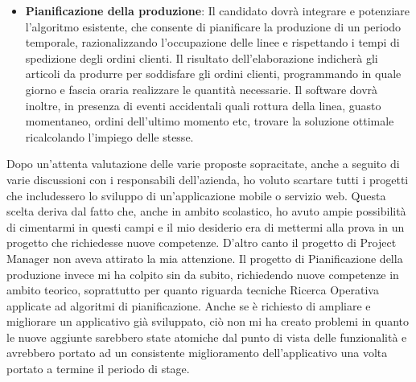 \begin{itemize}
	\item \textbf{Pianificazione della produzione}: Il candidato dovrà integrare e potenziare l’algoritmo esistente, che consente di
	pianificare la produzione di un periodo temporale, razionalizzando l’occupazione delle
	linee e rispettando i tempi di spedizione degli ordini clienti.
	Il risultato dell’elaborazione indicherà gli articoli da produrre per soddisfare gli ordini
	clienti, programmando in quale giorno e fascia oraria realizzare le quantità necessarie. Il
	software dovrà inoltre, in presenza di eventi accidentali quali rottura della linea, guasto
	momentaneo, ordini dell’ultimo momento etc, trovare la soluzione ottimale
	ricalcolando l’impiego delle stesse.
	
	
\end{itemize}


Dopo un'attenta valutazione delle varie proposte sopracitate, anche a seguito di varie discussioni con i responsabili dell'azienda, ho voluto scartare tutti i progetti
che includessero lo sviluppo di un'applicazione mobile o servizio web. Questa scelta deriva dal fatto che, anche in ambito scolastico, ho avuto ampie possibilità di 
cimentarmi in questi campi e il mio desiderio era di mettermi alla prova in un progetto che richiedesse nuove competenze. D'altro canto il progetto di Project Manager
non aveva attirato la mia attenzione. Il progetto di Pianificazione della produzione invece mi ha colpito sin da subito, richiedendo nuove competenze in ambito teorico,
soprattutto per quanto riguarda tecniche Ricerca Operativa applicate ad algoritmi di pianificazione. Anche se è richiesto di ampliare e migliorare un applicativo già 
sviluppato, ciò non mi ha creato problemi in quanto le nuove aggiunte sarebbero state atomiche dal punto di vista delle funzionalità e avrebbero portato ad un consistente
miglioramento dell'applicativo una volta portato a termine il periodo di stage.

\pagebreak

